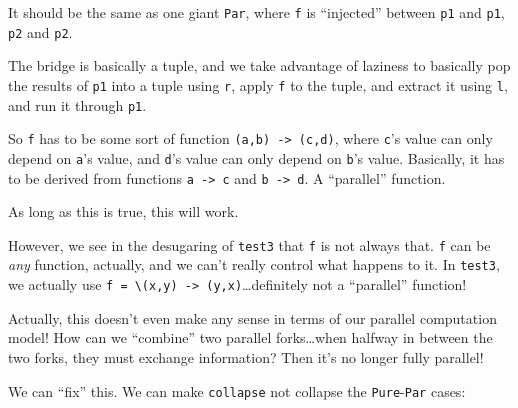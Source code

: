 \documentclass[]{article}
\begin{document}
It should be the same as one giant \texttt{Par}, where \texttt{f} is
``injected'' between \texttt{p1} and \texttt{p1\textquotesingle{}}, \texttt{p2}
and \texttt{p2\textquotesingle{}}.

The bridge is basically a tuple, and we take advantage of laziness to basically
pop the results of \texttt{p1} into a tuple using \texttt{r}, apply \texttt{f}
to the tuple, and extract it using \texttt{l}, and run it through
\texttt{p1\textquotesingle{}}.

So \texttt{f} has to be some sort of function
\texttt{(a,b)\ -\textgreater{}\ (c,d)}, where \texttt{c}'s value can only depend
on \texttt{a}'s value, and \texttt{d}'s value can only depend on \texttt{b}'s
value. Basically, it has to be derived from functions
\texttt{a\ -\textgreater{}\ c} and \texttt{b\ -\textgreater{}\ d}. A
``parallel'' function.

As long as this is true, this will work.

However, we see in the desugaring of \texttt{test3} that \texttt{f} is not
always that. \texttt{f} can be \emph{any} function, actually, and we can't
really control what happens to it. In \texttt{test3}, we actually use
\texttt{f\ =\ \textbackslash{}(x,y)\ -\textgreater{}\ (y,x)}\ldots definitely
not a ``parallel'' function!

Actually, this doesn't even make any sense in terms of our parallel computation
model! How can we ``combine'' two parallel forks\ldots when halfway in between
the two forks, they must exchange information? Then it's no longer fully
parallel!

We can ``fix'' this. We can make \texttt{collapse} not collapse the
\texttt{Pure}-\texttt{Par} cases:
\end{document}
